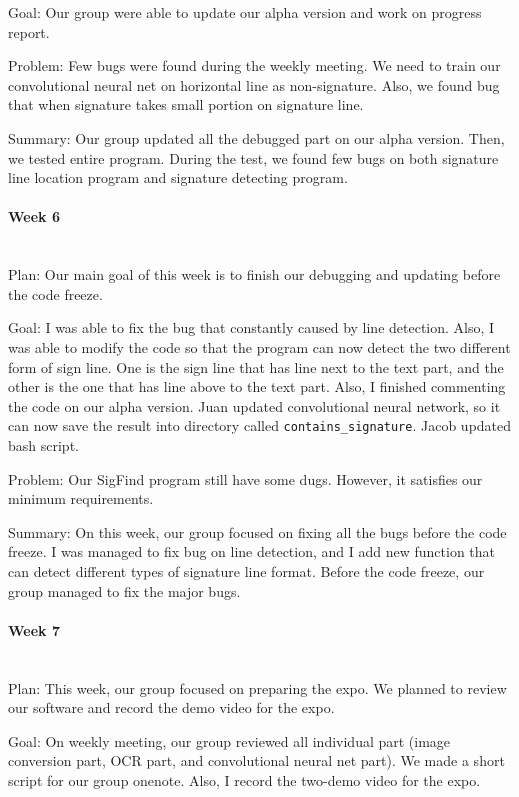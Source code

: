 \documentclass[article, onecolumn, draftclsnofoot,10pt, compsoc]{IEEEtran}
\begin{document}
Goal: Our group were able to update our alpha version and work on progress report.

Problem: Few bugs were found during the weekly meeting. We need to train our convolutional neural net on horizontal line as non-signature. Also, we found bug that when signature takes small portion on signature line.

Summary: Our group updated all the debugged part on our alpha version. Then, we tested entire program. During the test, we found few bugs on both signature line location program and signature detecting program.

\paragraph{Week 6}
\mbox{}\\
Plan: Our main goal of this week is to finish our debugging and updating before the code freeze.

Goal: I was able to fix the bug that constantly caused by line detection. Also, I was able to modify the code so that the program can now detect the two different form of sign line. One is the sign line that has line next to the text part, and the other is the one that has line above to the text part. Also, I finished commenting the code on our alpha version. Juan updated convolutional neural network, so it can now save the result into directory called \texttt{contains\_signature}. Jacob updated bash script.

Problem: Our SigFind program still have some dugs. However, it satisfies our minimum requirements.

Summary: On this week, our group focused on fixing all the bugs before the code freeze. I was managed to fix bug on line detection, and I add new function that can detect different types of signature line format. Before the code freeze, our group managed to fix the major bugs.

\paragraph{Week 7}
\mbox{}\\
Plan: This week, our group focused on preparing the expo. We planned to review our software and record the demo video for the expo.

Goal: On weekly meeting, our group reviewed all individual part (image conversion part, OCR part, and convolutional neural net part). We made a short script for our group onenote. Also, I record the two-demo video for the expo.
\end{document}
